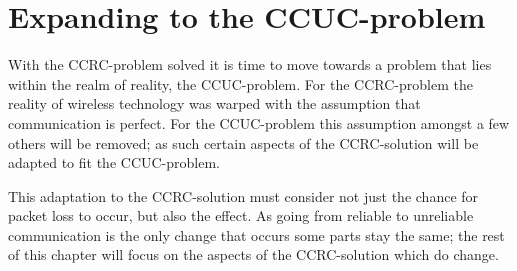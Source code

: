 \chapter{Expanding to the CCUC-problem}\label{CCUC}
With the CCRC-problem solved it is time to move towards a problem that lies within the realm of reality, the CCUC-problem.
For the CCRC-problem the reality of wireless technology was warped with the assumption that communication is perfect.
For the CCUC-problem this assumption amongst a few others will be removed; as such certain aspects of the CCRC-solution will be adapted to fit the CCUC-problem.

This adaptation to the CCRC-solution must consider not just the chance for packet loss to occur, but also the effect.
As going from reliable to unreliable communication is the only change that occurs some parts stay the same; the rest of this chapter will focus on the aspects of the CCRC-solution which do change.







